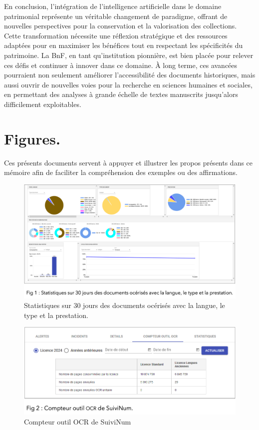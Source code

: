 \documentclass[a4paper,12pt,twoside]{book}
\begin{document}
	En conclusion, l'intégration de l'intelligence artificielle dans le domaine patrimonial représente un véritable changement de paradigme, offrant de nouvelles perspectives pour la conservation et la valorisation des collections. Cette transformation nécessite une réflexion stratégique et des ressources adaptées pour en maximiser les bénéfices tout en respectant les spécificités du patrimoine. La BnF, en tant qu'institution pionnière, est bien placée pour relever ces défis et continuer à innover dans ce domaine. À long terme, ces avancées pourraient non seulement améliorer l'accessibilité des documents historiques, mais aussi ouvrir de nouvelles voies pour la recherche en sciences humaines et sociales, en permettant des analyses à grande échelle de textes manuscrits jusqu'alors difficilement exploitables.
	
	
	
\newpage{\pagestyle{empty}\cleardoublepage}








\appendix %
\chapter{Figures.}
Ces présents documents servent à appuyer et illustrer les propos présents dans ce mémoire afin de faciliter la compréhension des exemples ou des affirmations.
\newpage

\begin{figure}
	\centering
	\includegraphics[width=0.7\linewidth]{images/stat_suivinum}
	\caption{Statistiques sur 30 jours des documents océrisés avec la langue, le type et la prestation.}
	\label{fig:statsuivinum}
\end{figure}

\begin{figure}
	\centering
	\includegraphics[width=0.7\linewidth]{images/compteur_ocr}
	\caption{Compteur outil OCR de SuiviNum}
	\label{fig:compteurocr}
\end{figure}
\end{document}
